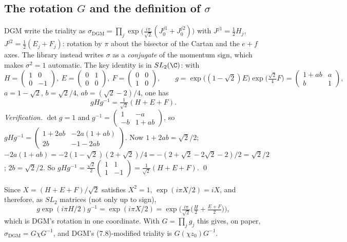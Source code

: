 \subsection{The rotation \texorpdfstring{$G$}{G} and the definition of \texorpdfstring{$\sigma$}{sigma}}

DGM write the triality as $\sigma_{\mathrm{DGM}}=\prod_j\exp\!\big(\tfrac{i\pi}{\sqrt2}(J^{j1}_0+J^{j2}_0)\big)$
with $J^{j1}=\tfrac12H_j$, $J^{j2}=\tfrac12(E_j+F_j)$: rotation by $\pi$ about the bisector of the
Cartan and the $e+f$ axes.  The library instead writes $\sigma$ as a \emph{conjugate} of the
momentum sign, which makes $\sigma^2=1$ automatic.  The key identity is in $SL_2(\C)$: with
\begin{equation*}
  H=\begin{pmatrix}1&0\\0&-1\end{pmatrix},\ E=\begin{pmatrix}0&1\\0&0\end{pmatrix},\
  F=\begin{pmatrix}0&0\\1&0\end{pmatrix},\qquad
  g=\exp\big((1-\sqrt2)E\big)\exp\big(\tfrac{\sqrt2}{4}F\big)
  =\begin{pmatrix}1+ab&a\\ b&1\end{pmatrix},
\end{equation*}
$a=1-\sqrt2$, $b=\sqrt2/4$, $ab=(\sqrt2-2)/4$, one has
\begin{equation}\label{ch11:eq:gHg}
  gHg^{-1}=\tfrac1{\sqrt2}(H+E+F).
\end{equation}
\emph{Verification.}  $\det g=1$ and $g^{-1}=\begin{pmatrix}1&-a\\-b&1+ab\end{pmatrix}$, so
$gHg^{-1}=\begin{pmatrix}1+2ab&-2a(1+ab)\\2b&-1-2ab\end{pmatrix}$.  Now $1+2ab=\sqrt2/2$;
$-2a(1+ab)=-2(1-\sqrt2)(2+\sqrt2)/4=-(2+\sqrt2-2\sqrt2-2)/2=\sqrt2/2$; $2b=\sqrt2/2$.  So
$gHg^{-1}=\tfrac{\sqrt2}{2}\begin{pmatrix}1&1\\1&-1\end{pmatrix}=\tfrac1{\sqrt2}(H+E+F)$. \qed

Since $X=(H+E+F)/\sqrt2$ satisfies $X^2=1$, $\exp(i\pi X/2)=iX$, and therefore, as $SL_2$ matrices
(not only up to sign),
\begin{equation*}
  g\exp(i\pi H/2)g^{-1}=\exp(i\pi X/2)=\exp\!\Big(\tfrac{i\pi}{\sqrt2}\big(\tfrac H2+\tfrac{E+F}2\big)\Big),
\end{equation*}
which is DGM's rotation in one coordinate.  With $G=\prod_jg_j$ this gives, on paper,
$\sigma_{\mathrm{DGM}}=G\chi G^{-1}$, and DGM's (7.8)-modified triality is $G(\chi z_0)G^{-1}$.

